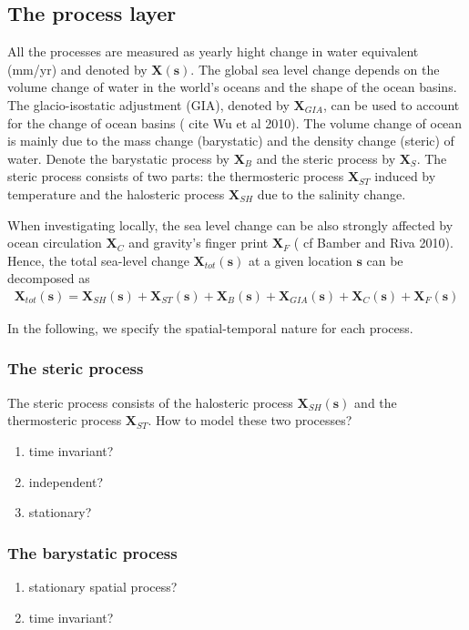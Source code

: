 \documentclass[cmbright,fleqn,referee]{envauth}
\newcommand{\bX}{\bm{X}}
\newcommand{\bs}{\bm{s}}
\begin{document}
\subsection{The process layer}
\label{ss:process}
All the processes are measured as yearly hight change in water equivalent (mm/yr) and denoted by $\bX(\bs)$. The global sea level change depends on the volume change of water in the world's oceans and the shape of the ocean basins. The glacio-isostatic adjustment (GIA), denoted by $\bX_{GIA}$, can be used to account for the change of ocean basins ({\color{red} cite Wu et al 2010}). The volume change of ocean is mainly due to the mass change (barystatic) and the density change (steric) of water. Denote the barystatic process by $\bX_{B}$ and the steric process by $\bX_{S}$. The steric process consists of two parts: the thermosteric process $\bX_{ST}$ induced by temperature and the halosteric process $\bX_{SH}$ due to the salinity change.


When investigating locally, the sea level change can be also strongly affected by ocean circulation $\bX_{C}$ and gravity's finger print $\bX_{F}$ ({\color{red} cf Bamber and Riva 2010}). Hence, the total sea-level change $\bX_{tot} (\bs)$ at a given location $\bs$ can be decomposed as
\begin{align}\label{x_tot}
\bX_{tot} (\bs) = \bX_{SH}(\bs) + \bX_{ST}(\bs) + \bX_{B}(\bs) + \bX_{GIA}(\bs) + \bX_{C}(\bs) + \bX_F(\bs) 
\end{align}

In the following, we specify the spatial-temporal nature for each process.

\subsubsection{The steric process}
The steric process consists of the halosteric process $\bX_{SH}(\bs)$ and the thermosteric process $\bX_{ST}$. How to model these two processes?
\begin{enumerate}
\item time invariant?
\item independent?
\item stationary?
\end{enumerate} 

\subsubsection{The barystatic process}
\begin{enumerate}
\item stationary spatial process?
\item time invariant?
\end{enumerate}
\end{document}
